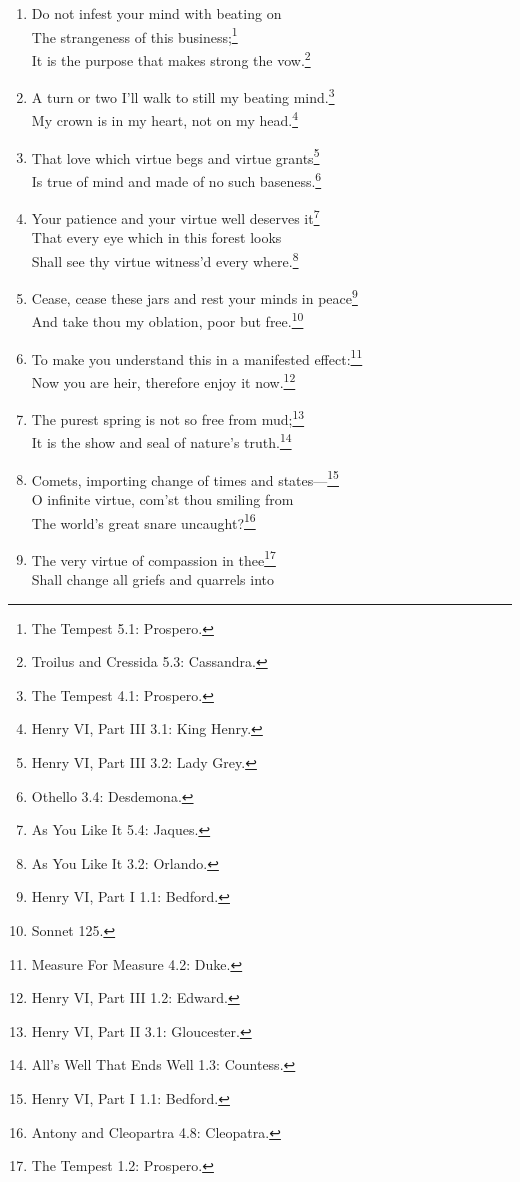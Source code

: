 \documentclass[17pt,twoside]{extarticle}
\begin{document}
\begin{enumerate}
  thoughts and change misdoubt to resolution. \footnote{Henry VI, Part
    II 3.1: York.}
\item
  Do not infest your mind with beating on\\The strangeness of this
  business;\footnote{The Tempest 5.1: Prospero.}\\It is the purpose that
  makes strong the vow.\footnote{Troilus and Cressida 5.3: Cassandra.}
\item
  A turn or two I'll walk to still my beating mind.\footnote{The Tempest
    4.1: Prospero.}\\My crown is in my heart, not on my head.\footnote{Henry
    VI, Part III 3.1: King Henry.}
\item
  That love which virtue begs and virtue grants\footnote{Henry VI, Part
    III 3.2: Lady Grey.}\\Is true of mind and made of no such
  baseness.\footnote{Othello 3.4: Desdemona.}
\item
  Your patience and your virtue well deserves it\footnote{As You Like It
    5.4: Jaques.}\\That every eye which in this forest looks\\Shall see
  thy virtue witness'd every where.\footnote{As You Like It 3.2:
    Orlando.}
\item
  Cease, cease these jars and rest your minds in peace\footnote{Henry
    VI, Part I 1.1: Bedford.}\\And take thou my oblation, poor but
  free.\footnote{Sonnet 125.}
\item
  To make you understand this in a manifested effect:\footnote{Measure
    For Measure 4.2: Duke.}\\Now you are heir, therefore enjoy it
  now.\footnote{Henry VI, Part III 1.2: Edward.}
\item
  The purest spring is not so free from mud;\footnote{Henry VI, Part II
    3.1: Gloucester.}\\It is the show and seal of nature's
  truth.\footnote{All's Well That Ends Well 1.3: Countess.}
\item
  Comets, importing change of times and states---\footnote{Henry VI,
    Part I 1.1: Bedford.}\\O infinite virtue, com'st thou smiling
  from\\The world's great snare uncaught?\footnote{Antony and Cleopartra
    4.8: Cleopatra.}
\item
  The very virtue of compassion in thee\footnote{The Tempest 1.2:
    Prospero.}\\Shall change all griefs and quarrels into

\end{enumerate}
\end{document}
